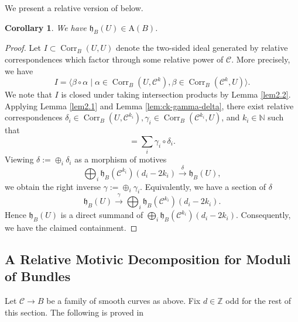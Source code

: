 \documentclass[11pt]{amsart}
\newcommand\Z{\mathbb{Z}}
\newtheorem{corollary}{Corollary}[theorem]
\theoremstyle{definition}
\newcommand{\mC}{\mathcal{C}}
\begin{document}
We present a relative version of \cite[Theorem 0.1]{MR4046978} below.
\begin{corollary}\label{U has abelian motive}
    We have $\mathfrak h_B (U)\in \mathrm A(B)$. 
\end{corollary}
\begin{proof}
Let $I\subset \operatorname{Corr}_B(U,U)$ denote the two-sided ideal generated by relative correspondences which factor through some relative power of $\mathcal C$. More precisely, we have \begin{equation*}
     I = \langle  \beta\circ \alpha \mid \alpha \in \operatorname{Corr}_B(U,\mC^k), \beta \in \operatorname{Corr}_B(\mC^k,U)\rangle .
 \end{equation*}
 We note that $I$ is closed under taking intersection products by Lemma \ref{lem2.2}. 
  Applying Lemma \ref{lem2.1} and Lemma \ref{lem:ck-gamma-delta}, there exist relative correspondences 
 $\delta_i \in \operatorname{Corr}_B(U,\mC^{k_i}), \gamma_i\in \operatorname{Corr}_B(\mC^{k_i},U) $, and $k_i\in \mathbb{N}$ such that 
 \begin{equation*}
     [\Delta_{U/B}] = \sum_i \gamma_i \circ \delta_i.
 \end{equation*}
 Viewing $\delta :=\oplus_i \delta_i$ as a morphism of motives \begin{equation*}
      \bigoplus_i \mathfrak h_B (\mathcal C^{k_i})(d_i-2k_i)\xrightarrow{\delta}\mathfrak h_B(U),
 \end{equation*} 
 we obtain the right inverse $\gamma:= \oplus_i \gamma_i $. Equivalently, we have a section of $\delta$
 \begin{equation*}
     \mathfrak h_B (U) \xrightarrow{\gamma} \bigoplus_i \mathfrak h_B (\mathcal C^{k_i})(d_i-2k_i).
 \end{equation*}
 Hence $\mathfrak h_B(U)$ is a direct summand of $\bigoplus_i \mathfrak h_B (\mathcal C^{k_i})(d_i-2k_i)$.
 Consequently, we have the claimed containment.
\end{proof}


\subsection{A Relative Motivic Decomposition for Moduli of Bundles}\label{sec:rel-motive-decomp}
 Let $\mathcal C\rightarrow B$ be a family of smooth curves as above. Fix $d\in\Z$ odd for the rest of this section. The following is proved in \cite[Theorem 4.3]{hoskins}
\end{document}

